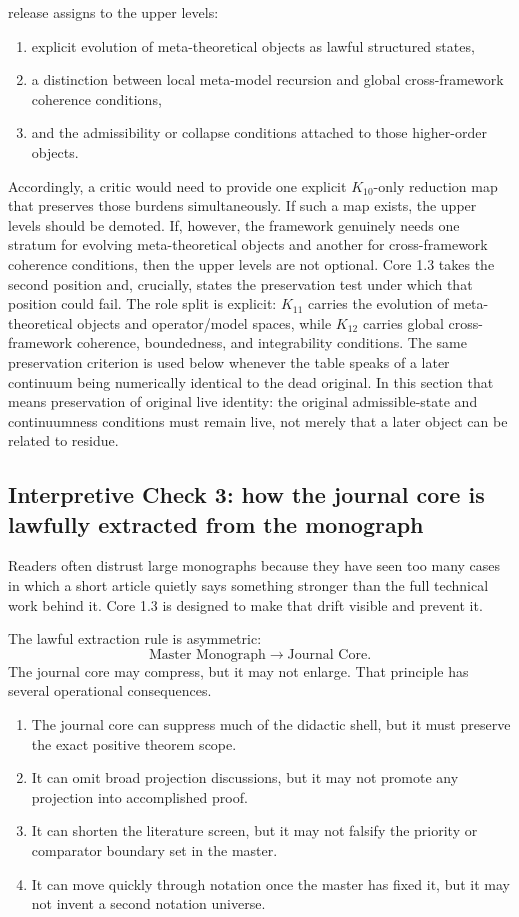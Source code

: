 release assigns to the upper levels:
\begin{enumerate}
\item explicit evolution of meta-theoretical objects as lawful structured
      states,
\item a distinction between local meta-model recursion and global
      cross-framework coherence conditions,
\item and the admissibility or collapse conditions attached to those
      higher-order objects.
\end{enumerate}
Accordingly, a critic would need to provide one explicit \(K_{10}\)-only
reduction map that preserves those burdens simultaneously. If such a map
exists, the upper levels should be demoted. If, however, the framework
genuinely needs one stratum for evolving meta-theoretical objects and another
for cross-framework coherence conditions, then the upper levels are not
optional. Core 1.3 takes the second position and, crucially, states the
preservation test under which that position could fail.
The role split is explicit: \(K_{11}\) carries the evolution of
meta-theoretical objects and operator/model spaces, while \(K_{12}\) carries
global cross-framework coherence, boundedness, and integrability conditions.
The same preservation criterion is used below whenever the table speaks of a
later continuum being numerically identical to the dead original. In this
section that means preservation of original live identity: the original
admissible-state and continuumness conditions must remain live, not merely
that a later object can be related to residue.

\subsection{Interpretive Check 3: how the journal core is lawfully extracted from the monograph}

Readers often distrust large monographs because they have seen too many cases in which a short
article quietly says something stronger than the full technical work behind it. Core 1.3 is
designed to make that drift visible and prevent it.

The lawful extraction rule is asymmetric:
\[
\text{Master Monograph} \longrightarrow \text{Journal Core}.
\]
The journal core may compress, but it may not enlarge. That principle has several operational
consequences.

\begin{enumerate}
\item The journal core can suppress much of the didactic shell, but it must preserve the exact
      positive theorem scope.
\item It can omit broad projection discussions, but it may not promote any projection into
      accomplished proof.
\item It can shorten the literature screen, but it may not falsify the priority or comparator
      boundary set in the master.
\item It can move quickly through notation once the master has fixed it, but it may not invent a
      second notation universe.
\end{enumerate}

